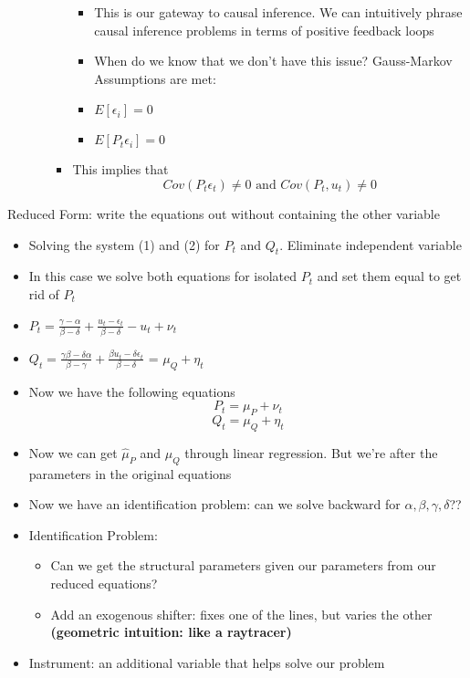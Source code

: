 \documentclass[10pt, oneside]{article}
\begin{document}
\begin{itemize}
\begin{itemize}
\begin{itemize}
\begin{itemize}
                \item This is our gateway to causal inference. We can intuitively phrase causal inference problems in terms of positive feedback loops
                \item When do we know that we don't have this issue? Gauss-Markov Assumptions are met:
                \item $E[\epsilon_i] = 0$
                \item $E[P_t \epsilon_i] = 0$
            \end{itemize}
            \item This implies that \[ Cov(P_t\epsilon_t) \neq 0\text{ and }Cov(P_t,u_t) \neq 0\]
        \end{itemize}
    \end{itemize}
\end{itemize}
Reduced Form: write the equations out without containing the other variable
\begin{itemize}
    \item Solving the system (1) and (2) for $P_t$ and $Q_t$. Eliminate independent variable
    \item In this case we solve both equations for isolated $P_t$ and set them equal to get rid of $P_t$
    \item $P_t = \frac{\gamma - \alpha}{\beta - \delta} + \frac{u_t - \epsilon_t}{\beta - \delta} - u_t + \nu_t$
    \item $Q_t = \frac{\gamma \beta - \delta \alpha}{\beta - \gamma} + \frac{\beta u_t - \delta \epsilon_t}{\beta - \delta}$ = $\mu_Q + \eta_t$
    \item Now we have the following equations\[P_t = \mu_P + \nu_t\]\[Q_t = \mu_Q + \eta_t\]
    \item Now we can get $\hat \mu_P$ and $\mu_Q$ through linear regression. But we're after the parameters in the original equations
    \item Now we have an identification problem: can we solve backward for $\alpha, \beta, \gamma, \delta$??
    \item Identification Problem:
    \begin{itemize}
        \item Can we get the structural parameters given our parameters from our reduced equations?
        \item Add an exogenous shifter: fixes one of the lines, but varies the other \textbf{(geometric intuition: like a raytracer)}
    \end{itemize}
    \item Instrument: an additional variable that helps solve our problem
\end{itemize}
\end{document}
